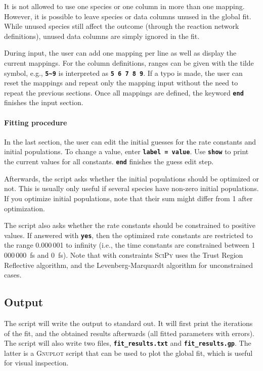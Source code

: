 \documentclass[a4paper,10pt,DIV=15,openany]{scrbook}
\newcommand{\ttt}[1]{\textbf{\texttt{#1}}}
\begin{document}
It is not allowed to use one species or one column in more than one mapping.
However, it is possible to leave species or data columns unused in the global fit. 
While unused species still affect the outcome (through the reaction network definitions), unused data columns are simply ignored in the fit.

During input, the user can add one mapping per line as well as display the current mappings.
For the column definitions, ranges can be given with the tilde symbol, e.g., \ttt{5\textasciitilde 9} is interpreted as \ttt{5 6 7 8 9}.
If a typo is made, the user can reset the mappings and repeat only the mapping input without the need to repeat the previous sections.
Once all mappings are defined, the keyword \ttt{end} finishes the input section.

\paragraph{Fitting procedure}

In the last section, the user can edit the initial guesses for the rate constants and initial populations.
To change a value, enter \ttt{label = value}.
Use \ttt{show} to print the current values for all constants.
\ttt{end} finishes the guess edit step.

Afterwards, the script asks whether the initial populations should be optimized or not. 
This is usually only useful if several species have non-zero initial populations.
If you optimize initial populations, note that their sum might differ from 1 after optimization.

The script also asks whether the rate constants should be constrained to positive values.
If answered with \ttt{yes}, then the optimized rate constants are restricted to the range 0.000\,001 to infinity (i.e., the time constants are constrained between 1\,000\,000~fs and 0~fs).
Note that with constraints \textsc{SciPy} uses the Trust Region Reflective algorithm, and the Levenberg-Marquardt algorithm for unconstrained cases.

\subsection{Output}

The script will write the output to standard out.
It will first print the iterations of the fit, and the obtained results afterwards (all fitted parameters with errors).
The script will also write two files, \ttt{fit\_results.txt} and \ttt{fit\_results.gp}. 
The latter is a \textsc{Gnuplot} script that can be used to plot the global fit, which is useful for visual inspection.
\end{document}
